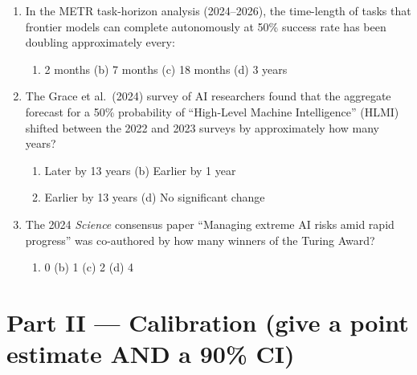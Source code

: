 \documentclass[11pt,a4paper]{article}
\begin{document}
\begin{enumerate}[label=Q\arabic*.]
\item In the METR task-horizon analysis (2024--2026), the time-length of
      tasks that frontier models can complete autonomously at 50\% success
      rate has been doubling approximately every:
\begin{enumerate}[label=(\alph*)]
    \item 2 months \qquad (b) 7 months \qquad
    (c) 18 months \qquad (d) 3 years
\end{enumerate}

\item The Grace et al.\ (2024) survey of AI researchers found that the
      aggregate forecast for a 50\% probability of ``High-Level Machine
      Intelligence'' (HLMI) shifted between the 2022 and 2023 surveys by
      approximately how many years?
\begin{enumerate}[label=(\alph*)]
    \item Later by 13 years \qquad (b) Earlier by 1 year
    \item Earlier by 13 years \qquad (d) No significant change
\end{enumerate}

\item The 2024 \emph{Science} consensus paper ``Managing extreme AI risks
      amid rapid progress'' was co-authored by how many winners of the
      Turing Award?
\begin{enumerate}[label=(\alph*)]
    \item 0 \qquad (b) 1 \qquad (c) 2 \qquad (d) 4
\end{enumerate}

\end{enumerate}

\vspace{1em}
\section*{Part II --- Calibration (give a point estimate AND a 90\% CI)}
\end{document}
